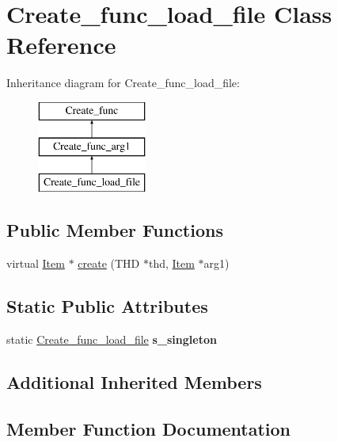 \hypertarget{classCreate__func__load__file}{}\section{Create\+\_\+func\+\_\+load\+\_\+file Class Reference}
\label{classCreate__func__load__file}
Inheritance diagram for Create\+\_\+func\+\_\+load\+\_\+file\+:\begin{figure}[H]
\begin{center}
\leavevmode
\includegraphics[height=3.000000cm]{classCreate__func__load__file}
\end{center}
\end{figure}
\subsection*{Public Member Functions}
\begin{DoxyCompactItemize}
\item 
virtual \mbox{\hyperlink{classItem}{Item}} $\ast$ \mbox{\hyperlink{classCreate__func__load__file_acdee180f58365b5216fa56c59edac322}{create}} (T\+HD $\ast$thd, \mbox{\hyperlink{classItem}{Item}} $\ast$arg1)
\end{DoxyCompactItemize}
\subsection*{Static Public Attributes}
\begin{DoxyCompactItemize}
\item 
\mbox{\label{classCreate__func__load__file_a691acc0379625892d84ecbefb9b29e6e}} 
static \mbox{\hyperlink{classCreate__func__load__file}{Create\+\_\+func\+\_\+load\+\_\+file}} {\bfseries s\+\_\+singleton}
\end{DoxyCompactItemize}
\subsection*{Additional Inherited Members}


\subsection{Member Function Documentation}
\mbox{\label{classCreate__func__load__file_acdee180f58365b5216fa56c59edac322}} 
